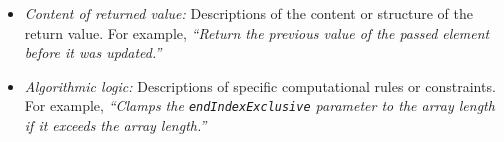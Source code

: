 \begin{itemize}
    \item \textit{Content of returned value:} Descriptions of the content or structure of the return value.
    For example, \textit{``Return the previous value of the passed element before it was updated.''}
    \item \textit{Algorithmic logic:} Descriptions of specific computational rules or constraints. For example, \textit{``Clamps the \texttt{endIndexExclusive} parameter to the array length if it exceeds the array length.''} 
\end{itemize} 




